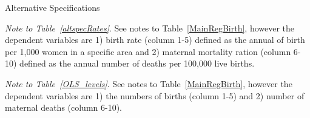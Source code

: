 \documentclass[a4paper, 11pt]{article}
\begin{document}
\begin{spacing}{1.4}
\begin{table}
  	\end{table}
 
 
 

 
  
 
 \setcounter{table}{6}
 

  
 \begin{table}\centering \caption{Alternative Specifications}\label{Alternative}
 	 
 	\begin{ThreePartTable}
 		
 		
 		\begin{subtable}{ 0.9  \textwidth}\centering {}\label{altspecRates}
 			{\scriptsize 	}
 		\end{subtable}%
 		
 		\begin{subtable}{ 0.9 \textwidth}\centering{}\label{OLS_levels}
 			{\scriptsize 	}
 		\end{subtable}%
 		
 		\begin{tablenotes} 
 			\tiny	\item \textit{Note to Table~\ref{altspecRates}}. See notes to Table~\ref{MainRegBirth}, however the dependent variables are 1) birth rate (column 1-5) defined as the annual of birth per 1,000 women in a specific area and 2) maternal mortality ration (column 6-10) defined as the annual number of deaths per 100,000 live births.\\
 			 \item \textit{Note to Table~\ref{OLS_levels}}. See notes to Table~\ref{MainRegBirth}, however the dependent variables are 1) the numbers of births (column 1-5) and 2) number of maternal deaths (column 6-10). 	
 		\end{tablenotes} 
 		
 	\end{ThreePartTable}
  
 \end{table} 
 
\restoregeometry
 
 
 
 
 

\end{spacing}
\end{document}
